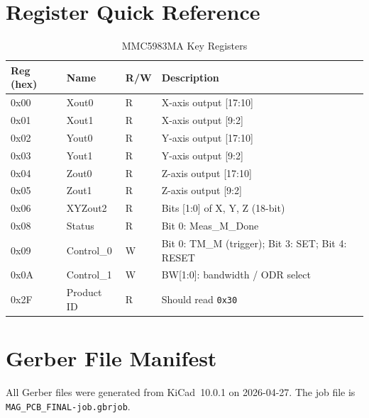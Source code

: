 \documentclass[12pt]{article}
\begin{document}
\section{Register Quick Reference}

\begin{table}[H]
  \centering
  \caption{MMC5983MA Key Registers}
  \begin{tabular}{lllp{6cm}}
    \toprule
    \textbf{Reg (hex)} & \textbf{Name} & \textbf{R/W} & \textbf{Description} \\
    \midrule
    0x00 & Xout0  & R & X-axis output [17:10] \\
    0x01 & Xout1  & R & X-axis output [9:2] \\
    0x02 & Yout0  & R & Y-axis output [17:10] \\
    0x03 & Yout1  & R & Y-axis output [9:2] \\
    0x04 & Zout0  & R & Z-axis output [17:10] \\
    0x05 & Zout1  & R & Z-axis output [9:2] \\
    0x06 & XYZout2 & R & Bits [1:0] of X, Y, Z (18-bit) \\
    0x08 & Status & R & Bit 0: Meas\_M\_Done \\
    0x09 & Control\_0 & W & Bit 0: TM\_M (trigger); Bit 3: SET; Bit 4: RESET \\
    0x0A & Control\_1 & W & BW[1:0]: bandwidth / ODR select \\
    0x2F & Product ID & R & Should read \texttt{0x30} \\
    \bottomrule
  \end{tabular}
  \label{tab:registers}
\end{table}

\section{Gerber File Manifest}

All Gerber files were generated from KiCad~10.0.1 on 2026-04-27.
The job file is \texttt{MAG\_PCB\_FINAL-job.gbrjob}.
\end{document}
